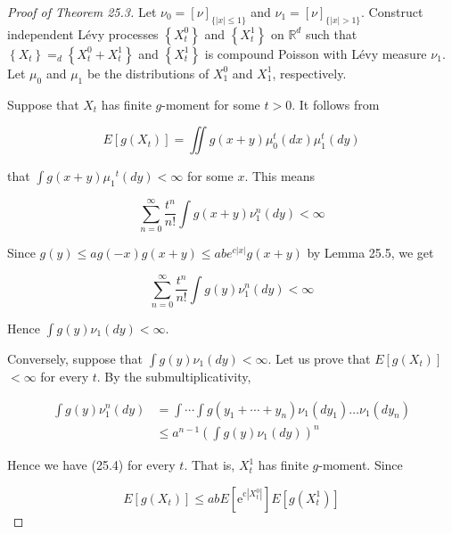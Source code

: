 \documentclass[a4paper,11pt]{article}
\begin{document}
\begin{proof}[Proof of Theorem 25.3]

    Let $\nu_{0}=[\nu]_{\{|x| \leq 1\}}$ and $\nu_{1}=[\nu]_{\{|x|>1\}}$. Construct
    independent Lévy processes $\left\{X_{t}^{0}\right\}$ and $\left\{X_{t}^{1}\right\}$ on $\mathbb{R}^{d}$ such
    that $\left\{X_{t}\right\} =_{d} \left\{X_{t}^{0}+ X_{t}^{1}\right\}$ and
    $\left\{X_{t}^{1}\right\}$ is compound Poisson with Lévy measure $\nu_{1}$. Let $\mu_{0}$ and $\mu_{1}$ be
    the distributions of $X_{1}^{0}$ and $X_{1}^{1}$, respectively.

    Suppose that $X_{t}$ has finite $g$-moment for some $t>0$. It follows from

    $$
        E\left[g\left(X_{t}\right)\right]=\iint g(x+y) \mu_{0}^{t}(dx) \mu_{1}^{t}(dy)
    $$

    that $\int g(x+y) \mu_{1}{ }^{t}(dy)<\infty$ for some $x$. This means

    $$
        \sum_{n=0}^{\infty} \frac{t^{n}}{n !} \int g(x+y) \nu_{1}^{n}(dy)<\infty
    $$

    Since $g(y) \leq a g(-x) g(x+y) \leq a b e^{c|x|} g(x+y)$ by Lemma 25.5, we get


    \begin{equation*}
        \sum_{n=0}^{\infty} \frac{t^{n}}{n !} \int g(y) \nu_{1}^{n}(dy)<\infty \tag{25.4}
    \end{equation*}

    Hence $\int g(y) \nu_{1}(d y)<\infty$.

    Conversely, suppose that $\int g(y) \nu_{1}(dy)<\infty$. Let us prove
    that $E\left[g\left(X_{t}\right)\right]$ $<\infty$ for every $t$. By the submultiplicativity,

    $$
        \begin{aligned}
            \int g(y) \nu_{1}^{n}(dy) & =\int \cdots \int g\left(y_{1}+\cdots+y_{n}\right) \nu_{1}\left(dy_{1}\right) \ldots \nu_{1}\left(d y_{n}\right) \\
                                      & \leq a^{n-1}\left(\int g(y) \nu_{1}(dy)\right)^{n}
        \end{aligned}
    $$

    Hence we have (25.4) for every $t$. That is, $X_{t}^{1}$ has finite $g$-moment. Since

    $$
        E\left[g\left(X_{t}\right)\right] \leq a b E\left[\mathrm{e}^{\mathrm{c}\left|X_{t}^{0}\right|}\right] E\left[g\left(X_{t}^{1}\right)\right]
    $$


\end{proof}
\end{document}
